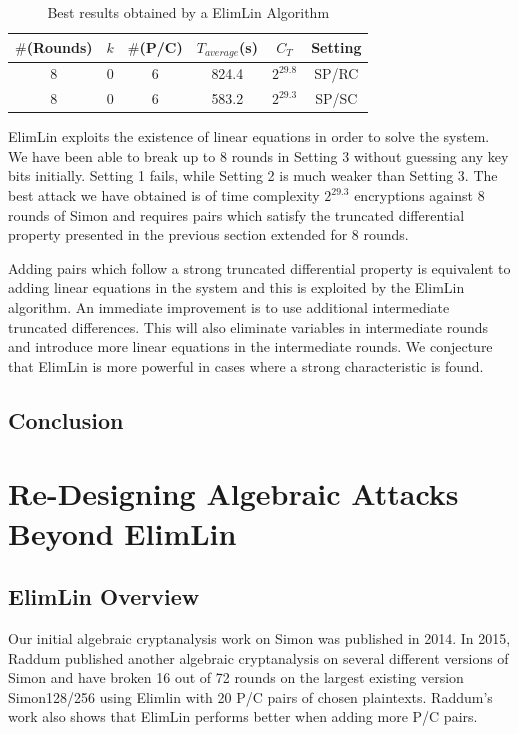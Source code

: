 \begin{table}[!h]
\caption{Best results obtained by a ElimLin Algorithm}\label{tab:SimonElimlin} \centering
\begin{tabular}{|c|c|c|c|c|c|}
  \hline
  $\#$(Rounds) & $k$ & $\#$(P/C) & $T_{average}$(s) & $C_T$ & Setting \\
  \hline
  8 & 0 & 6 & 824.4 & $2^{29.8}$ & SP/RC \\
 \hline
 8 & 0 & 6 & 583.2 & $2^{29.3}$ & SP/SC \\
  \hline
\end{tabular}
\end{table}

ElimLin exploits the existence of linear equations in order to solve the system. We have been able to break up to 8 rounds in Setting 3 without guessing any key bits
initially. Setting 1 fails, while Setting 2 is much weaker than Setting 3. The best
attack we have obtained is of time complexity $2^{29.3}$ encryptions against 8 rounds of Simon and requires pairs which satisfy
the truncated differential property presented in the previous section extended for 8 rounds.

Adding pairs which follow a strong truncated differential property is equivalent to adding linear equations in the system and this
is exploited by the ElimLin algorithm. An immediate improvement is to use additional intermediate truncated differences.
This will also eliminate variables in intermediate rounds and introduce more linear
equations in the intermediate rounds. We conjecture that ElimLin is more powerful
in cases where a strong characteristic is found.
\section{Conclusion}

\chapter{Re-Designing Algebraic Attacks Beyond ElimLin} \label{ch:ElimLIn}
\section{ElimLin Overview}
Our initial algebraic cryptanalysis work on Simon was published in 2014. In 2015,   Raddum \cite{RaddumSimon} published another algebraic cryptanalysis on several different versions of Simon and have broken 16 out of 72 rounds on the largest existing version Simon128/256 using Elimlin with 20 P/C pairs of chosen plaintexts. Raddum's work also shows that ElimLin performs better when adding more P/C pairs.  


